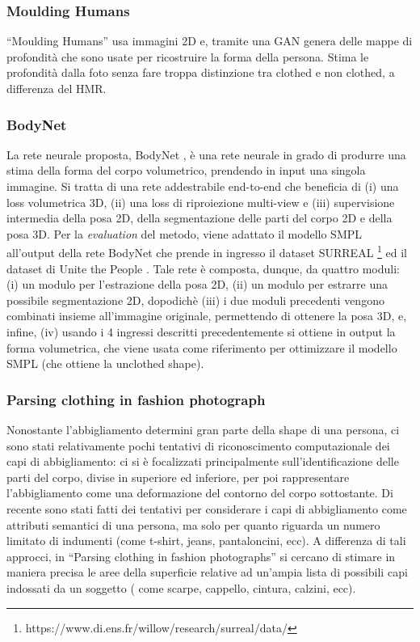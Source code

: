 \subsubsection{Moulding Humans}

“Moulding Humans” \cite{gabeur2019moulding} usa immagini 2D e, tramite una GAN genera delle mappe di profondità che sono usate per ricostruire la forma della persona.
Stima le profondità dalla foto senza fare troppa distinzione tra clothed e non clothed, a differenza del HMR.


\subsubsection{BodyNet}
La rete neurale proposta, BodyNet \cite{varol2018bodynet}, è una rete neurale in grado di produrre una stima della forma del corpo volumetrico, prendendo in input una singola immagine. Si tratta di una rete addestrabile end-to-end che beneficia di (i) una loss volumetrica 3D, (ii) una loss di riproiezione multi-view e (iii) supervisione intermedia della posa 2D, della segmentazione delle parti del corpo 2D e della posa 3D. Per la \textit{evaluation} del metodo, viene adattato il modello SMPL all’output della rete BodyNet che prende in ingresso il dataset SURREAL \footnote{https://www.di.ens.fr/willow/research/surreal/data/} \cite{varol2017learning} ed il dataset di Unite the People \cite{lassner2017unite}. Tale rete è composta, dunque, da quattro moduli: (i) un modulo per l’estrazione della posa 2D, (ii) un modulo per estrarre una possibile segmentazione 2D, dopodichè (iii) i due moduli precedenti vengono combinati insieme all'immagine originale, permettendo di ottenere la posa 3D, e, infine, (iv) usando i 4 ingressi descritti precedentemente si ottiene in output la forma volumetrica, che viene usata come riferimento per ottimizzare il modello SMPL (che ottiene la unclothed shape).

\subsubsection{Parsing clothing in fashion photograph}
Nonostante l’abbigliamento determini gran parte della shape di una persona, ci sono stati relativamente pochi tentativi di riconoscimento computazionale dei capi di abbigliamento: ci si è focalizzati principalmente sull’identificazione delle parti del corpo, divise in superiore ed inferiore, per poi rappresentare l’abbigliamento come una deformazione del contorno del corpo sottostante. Di recente sono stati fatti dei tentativi per considerare i capi di abbigliamento come attributi semantici di una persona, ma solo per quanto riguarda un numero limitato di indumenti (come t-shirt, jeans, pantaloncini, ecc).
A differenza di tali approcci, in “Parsing clothing in fashion photographs” \cite{yamaguchi2012parsing} si cercano di stimare in maniera precisa le aree della superficie relative ad un’ampia lista di possibili capi indossati da un soggetto ( come scarpe, cappello, cintura, calzini, ecc).

